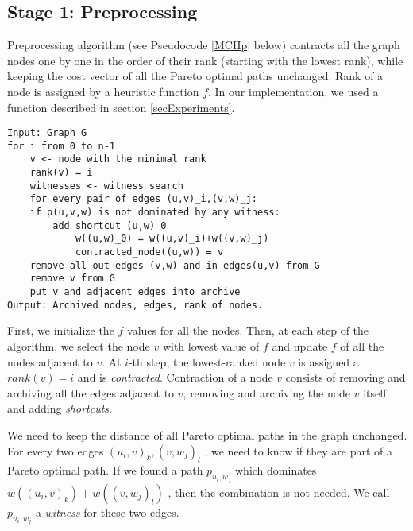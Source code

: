 

\subsection{Stage 1: Preprocessing}
\label{subsecStage1}

Preprocessing algorithm (see Pseudocode \ref{MCHp} below) contracts all the graph nodes one by one in the order of their rank (starting with the lowest rank), while keeping the cost vector of all the Pareto optimal paths unchanged. Rank of a node is assigned by a heuristic function $f$. In our implementation, we used a function described in section \ref{secExperiments}.

\renewcommand{\lstlistingname}{Pseudocode}
\begin{lstlisting}[caption={MCHp},label=MCHp,captionpos=t,float,abovecaptionskip=-\medskipamount]
Input: Graph G
for i from 0 to n-1
    v <- node with the minimal rank
    rank(v) = i
    witnesses <- witness search
    for every pair of edges (u,v)_i,(v,w)_j:
    if p(u,v,w) is not dominated by any witness:
        add shortcut (u,w)_0
            w((u,w)_0) = w((u,v)_i)+w((v,w)_j)
            contracted_node((u,w)) = v
    remove all out-edges (v,w) and in-edges(u,v) from G
    remove v from G
    put v and adjacent edges into archive
Output: Archived nodes, edges, rank of nodes.
\end{lstlisting}

First, we initialize the $f$ values for all the nodes. Then, at each step of the algorithm, we select the node $v$ with lowest value of $f$ and update $f$ of all the nodes adjacent to $v$. 
At $i$-th step, the lowest-ranked node $v$ is assigned a $rank(v) = i$ and is \emph{contracted}. 
Contraction of a node $v$ consists of removing and archiving all the edges adjacent to $v$, removing and archiving the node $v$ itself and adding {\em shortcuts}. 

We need to keep the distance of all Pareto optimal paths in the graph unchanged. For every two edges $(u_i,v)_k,(v,w_j)_l$ , we need to know if they are part of a Pareto optimal path. If we found a path $p_{u_i,w_j}$ which dominates $w((u_i,v)_k)+w((v,w_j)_l)$ , then the combination is not needed. We call $p_{u_i,w_j}$ a \emph{witness} for these two edges. 

